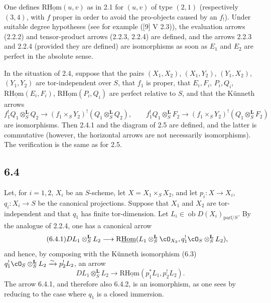 One defines $\mathrm{R}\underline{\mathrm{Hom}}(u,v)$ as in 2.1 for $(u,v)$ of type $(2,1)$ (respectively $(3,4)$, with $f$ proper in order to avoid the pro-objects caused by an $f_!$). Under suitable degree hypotheses (see for example ([9] V 2.3)), the evaluation arrows (2.2.2) and tensor-product arrows (2.2.3, 2.2.4) are defined, and the arrows 2.2.3 and 2.2.4 (provided they are defined) are isomorphisms as soon as $E_1$ and $E_2$ are perfect in the absolute sense.

In the situation of 2.4, suppose that the pairs $(X_1,X_2)$, $(X_1,Y_2)$, $(Y_1,X_2)$, $(Y_1,Y_2)$ are tor-independent over $S$, that $f_1$ is proper, that $E_i,F_i$, $P_i,Q_i$, $\mathrm{R}\underline{\mathrm{Hom}}(E_i,F_i)$, $\mathrm{R}\underline{\mathrm{Hom}}(P_i,Q_i)$ are perfect relative to $S$, and that the Künneth arrows
\[
f_1^!Q_1\otimes_S^{\mathbf L}Q_2\to(f_1\times_SY_2)^!(Q_1\otimes_S^{\mathbf L}Q_2),\qquad
f_1^!Q_1\otimes_S^{\mathbf L}F_2\to(f_1\times_SY_2)^!(Q_1\otimes_S^{\mathbf L}F_2)
\]
are isomorphisms. Then 2.4.1 and the diagram of 2.5 are defined, and the latter is commutative (however, the horizontal arrows are not necessarily isomorphisms). The verification is the same as for 2.5.

\subsection*{6.4}
Let, for $i=1,2$, $X_i$ be an $S$-scheme, let $X=X_1\times_SX_2$, and let $p_i:X\to X_i$, $q_i:X_i\to S$ be the canonical projections. Suppose that $X_1$ and $X_2$ are tor-independent and that $q_1$ has finite tor-dimension. Let $L_i\in\operatorname{ob}D(X_i)_{\mathrm{parf}/S}$. By the analogue of 2.2.4, one has a canonical arrow
\begin{equation}
\tag{6.4.1}
DL_1\otimes_S^{\mathbf L}L_2\longrightarrow \mathrm{R}\underline{\mathrm{Hom}}(L_1\otimes_S^{\mathbf L}\cO_{X_2},q_1^!\cO_S\otimes_S^{\mathbf L}L_2),
\end{equation}
and hence, by composing with the Künneth isomorphism (6.3) $q_1^!\cO_S\otimes_S^{\mathbf L}L_2\xrightarrow{\sim}p_2^!L_2$, an arrow
\begin{equation}
\tag{6.4.2}
DL_1\otimes_S^{\mathbf L}L_2\longrightarrow\mathrm{R}\underline{\mathrm{Hom}}(p_1^*L_1,p_2^!L_2).
\end{equation}
The arrow 6.4.1, and therefore also 6.4.2, is an isomorphism, as one sees by reducing to the case where $q_1$ is a closed immersion.

